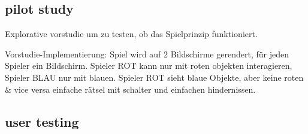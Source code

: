 \subsection{pilot study}
\label{section:pilot study}

Explorative vorstudie um zu testen, ob das Spielprinzip funktioniert.

Vorstudie-Implementierung:
Spiel wird auf 2 Bildschirme gerendert, für jeden Spieler ein Bildschirm.
Spieler ROT kann nur mit roten objekten interagieren, Spieler BLAU nur mit blauen.
Spieler ROT sieht blaue Objekte, aber keine roten & vice versa
einfache rätsel mit schalter und einfachen hindernissen.


\subsection{user testing}
\label{section:user testing}